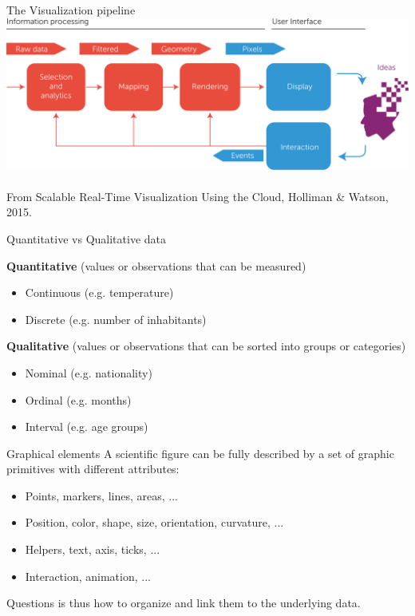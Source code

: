 \documentclass[10pt,aspectratio=169]{beamer}
\begin{document}
\begin{frame}{The Visualization pipeline}
  \includegraphics[width=\textwidth]{pipeline.png}
  ~\\
  From Scalable Real-Time Visualization Using the Cloud,
  Holliman \& Watson, 2015.\\
\end{frame}


\begin{frame}{Quantitative vs Qualitative data}

  \textbf{Quantitative}
         (values or observations that can be measured)\\
  \begin{itemize}
  \item Continuous (e.g. temperature) 
  \item Discrete (e.g. number of inhabitants)
  \end{itemize}
  \vfill
  \textbf{Qualitative}
         (values or observations that can be sorted into groups or categories)\\
  \begin{itemize}
  \item Nominal (e.g. nationality)
  \item Ordinal (e.g. months)
  \item Interval (e.g. age groups)
  \end{itemize}
  
\end{frame}

\begin{frame}{Graphical elements}
  A scientific figure can be fully described by a set of graphic primitives
  with different attributes:
  \begin{itemize}
  \item Points, markers, lines, areas, ...
  \item Position, color, shape, size, orientation, curvature, ...
  \item Helpers, text, axis, ticks, ...
  \item Interaction, animation, ...
  \end{itemize}
  
  Questions is thus how to organize and link them to the underlying data.
\end{frame}
\end{document}
